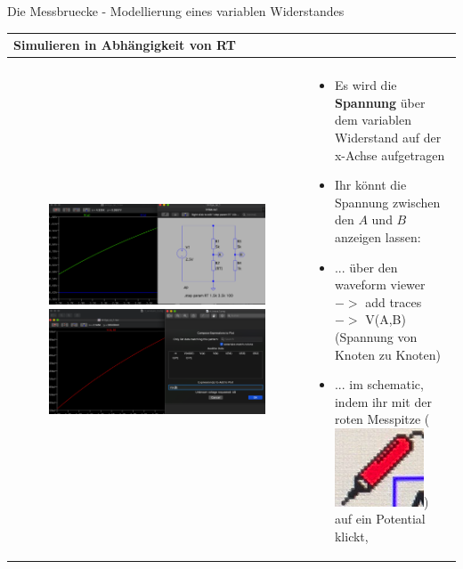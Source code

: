 \begin{frame}[t]{Die Messbruecke - Modellierung eines variablen Widerstandes}
\begin{spacing}{0.9}
\begin{tiny}
\begin{table}[h!]
\begin{tabular}{p{5cm} p{5cm}}
          \hline
          \textbf{Simulieren in Abhängigkeit von RT} \\
          \hline                                     \\
          \begin{minipage}{0.5\textwidth}
            \begin{figure}
              \centering
              \includegraphics[width=0.9\linewidth]{pictures/rt_analysis_1.png}
              \includegraphics[width=0.9\linewidth]{pictures/rt_analysis_3.png}
            \end{figure}
          \end{minipage}
           &
          \begin{minipage}{0.5\textwidth}
            \begin{itemize}
              \item Es wird die \textbf{Spannung} über dem variablen Widerstand auf der x-Achse aufgetragen
              \item Ihr könnt die Spannung zwischen den $A$ und $B$ anzeigen lassen:
              \item ... über den waveform viewer $->$ add traces $->$ V(A,B) (Spannung von Knoten zu Knoten)
              \item ... im schematic, indem ihr mit der roten Messpitze (\includegraphics[scale=0.1]{pictures/rot.png}) auf ein Potential klickt,

\end{itemize}
\end{minipage}
\end{tabular}
\end{table}
\end{tiny}
\end{spacing}
\end{frame}

